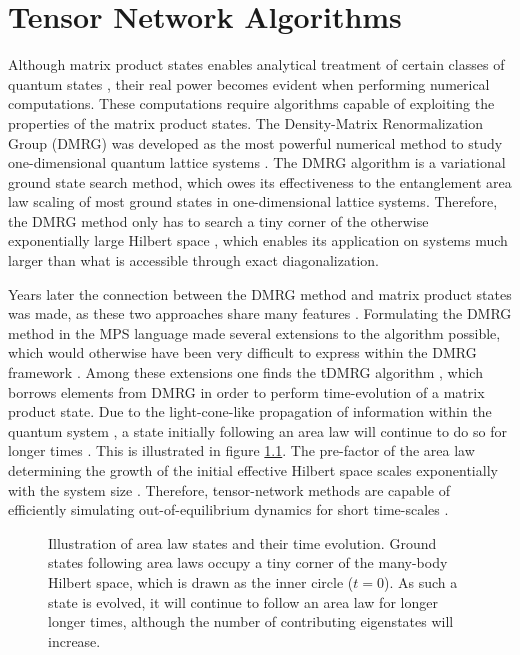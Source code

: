 \chapter{Tensor Network Algorithms}
Although matrix product states enables analytical treatment of certain classes of quantum states \cite{Baxter1968,Affleck1987}, their real power becomes evident when performing numerical computations. These computations require algorithms capable of exploiting the properties of the matrix product states. The Density-Matrix Renormalization Group (DMRG) was developed as the most powerful numerical method to study one-dimensional quantum lattice systems \cite{White1992,White1993}. The DMRG algorithm is a variational ground state search method, which owes its effectiveness to the entanglement area law scaling of most ground states in one-dimensional lattice systems. Therefore, the DMRG method only has to search a tiny corner of the otherwise exponentially large Hilbert space \cite{Cramer}, which enables its application on systems much larger than what is accessible through exact diagonalization.

Years later the connection between the DMRG method and matrix product states was made, as these two approaches share many features \cite{Ostlund1995, Dukelsky1998}. Formulating the DMRG method in the MPS language made several extensions to the algorithm possible, which would otherwise have been very difficult to express within the DMRG framework \cite{schollwock}. Among these extensions one finds the tDMRG algorithm \cite{Vidal2003,Vidal2004,Daley2004}, which borrows elements from DMRG in order to perform time-evolution of a matrix product state.
Due to the light-cone-like propagation of information within the quantum system \cite{Lauchli2008,Bravyi2006}, a state initially following an area law will continue to do so for longer times \cite{Bravyi2006,Eisert2006}. This is illustrated in figure \ref{fig:HilbertSpace}. The pre-factor of the area law determining the growth of the initial effective Hilbert space scales exponentially with the system size \cite{Schuch2008}. Therefore, tensor-network methods are capable of efficiently simulating out-of-equilibrium dynamics for short time-scales \cite{Eisert2015}.
\begin{figure}[h!]
	\centering
	
	\caption{Illustration of area law states and their time evolution. Ground states following area laws occupy a tiny corner of the many-body Hilbert space, which is drawn as the inner circle ($t = 0$). As such a state is evolved, it will continue to follow an area law for longer longer times, although the number of contributing eigenstates will increase. }
	\label{fig:HilbertSpace}
\end{figure}


